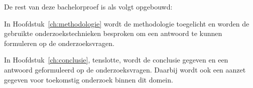 
De rest van deze bachelorproef is als volgt opgebouwd:

In Hoofdstuk~\ref{ch:methodologie} wordt de methodologie toegelicht en worden de gebruikte onderzoekstechnieken besproken om een antwoord te kunnen formuleren op de onderzoeksvragen.


In Hoofdstuk~\ref{ch:conclusie}, tenslotte, wordt de conclusie gegeven en een antwoord geformuleerd op de onderzoeksvragen. Daarbij wordt ook een aanzet gegeven voor toekomstig onderzoek binnen dit domein.

